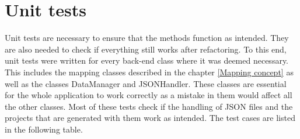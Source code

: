 \section{Unit tests}
Unit tests are necessary to ensure that the methods function as intended. They are also needed to check if everything still works after refactoring. To this end, unit tests were written for every back-end class where it was deemed necessary. This includes the mapping classes described in the chapter \ref{Mapping concept} as well as the classes DataManager and JSONHandler. These classes are essential for the whole application to work correctly as a mistake in them would affect all the other classes. Most of these tests check if the handling of JSON files and the projects that are generated with them work as intended. The test cases are listed in the following table.
\\ \\
